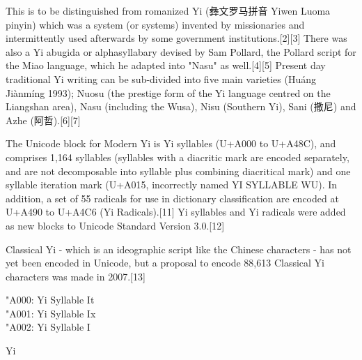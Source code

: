 This is to be distinguished from romanized Yi (彝文罗马拼音 Yiwen Luoma pinyin) which was a system (or systems) invented by missionaries and intermittently used afterwards by some government institutions.[2][3] There was also a Yi abugida or alphasyllabary devised by Sam Pollard, the Pollard script for the Miao language, which he adapted into "Nasu" as well.[4][5] Present day traditional Yi writing can be sub-divided into five main varieties (Huáng Jiànmíng 1993); Nuosu (the prestige form of the Yi language centred on the Liangshan area), Nasu (including the Wusa), Nisu (Southern Yi), Sani (撒尼) and Azhe (阿哲).[6][7]

The Unicode block for Modern Yi is Yi syllables (U+A000 to U+A48C), and comprises 1,164 syllables (syllables with a diacritic mark are encoded separately, and are not decomposable into syllable plus combining diacritical mark) and one syllable iteration mark (U+A015, incorrectly named YI SYLLABLE WU). In addition, a set of 55 radicals for use in dictionary classification are encoded at U+A490 to U+A4C6 (Yi Radicals).[11] Yi syllables and Yi radicals were added as new blocks to Unicode Standard Version 3.0.[12]

Classical Yi - which is an ideographic script like the Chinese characters - has not yet been encoded in Unicode, but a proposal to encode 88,613 Classical Yi characters was made in 2007.[13]

\bgroup
\yi \char"A000: Yi Syllable It\\

\yi \char"A001: Yi Syllable Ix\\

\yi \char"A002: Yi Syllable I\\
\egroup

\begin{scriptexample}[]{Yi}
\end{scriptexample}


